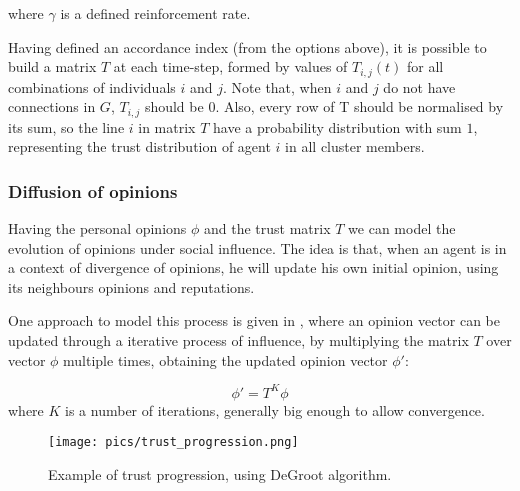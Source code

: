 \documentclass[conference,compsoc]{IEEEtran}
\begin{document}
where $\gamma$ is a defined reinforcement rate.






Having defined an accordance index (from the options above), it is possible to build a matrix $T$ at each time-step, formed by values of $T_{i,j}(t)$ for all combinations of individuals $i$ and $j$. Note that, when $i$ and $j$ do not have connections in $G$, $T_{i,j}$ should be $0$. Also, every row of T should be normalised by its sum, so the line $i$ in matrix $T$ have a probability distribution with sum $1$, representing the trust distribution of agent $i$ in all cluster members.


\subsubsection*{Diffusion of opinions}


Having the personal opinions $\phi$ and the trust matrix $T$ we can model the evolution of opinions under social influence. The idea is that, when an agent is in a context of divergence of opinions, he will update his own initial opinion, using its neighbours opinions and reputations.

One approach to model this process is given in \cite{degott}, where an opinion vector can be updated through a iterative process of influence, by multiplying the matrix $T$ over vector $\phi$ multiple times, obtaining the updated opinion vector $\phi'$:

\begin{equation}
  \phi' = T^{K}\phi   
\end{equation}
where $K$ is a number of iterations, generally big enough to allow convergence.

\begin{figure}
    \centering
    \texttt{[image: pics/trust\_progression.png]}
    \caption{Example of trust progression, using DeGroot algorithm.}
    \label{fig:deGroot}
\end{figure}
\end{document}
